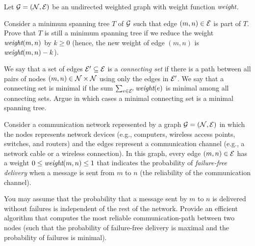 \begin{problem}
Let $\mathcal{G} = (\mathcal{N}, \mathcal{E})$ be an undirected weighted graph with weight function $\mathord{\textit{weight}}$. 
\begin{questions}
\item Consider a minimum spanning tree $T$ of $\mathcal{G}$ such that edge $(m, n) \in \mathcal{E}$ is part of $T$. Prove that $T$ is still a minimum spanning tree if we reduce the weight $\mathord{\textit{weight}}{(m, n)}$ by $k \geq 0$ (hence, the new weight of edge $(m, n)$ is $\mathord{\textit{weight}}{(m, n)} - k$).
\item We say that a set of edges $\mathcal{E}' \subseteq \mathcal{E}$ is a \emph{connecting set} if there is a path between all pairs of nodes $(m, n) \in \mathcal{N}\times\mathcal{N}$ using only the edges in $\mathcal{E}'$. We say that a connecting set is minimal if the sum $\sum_{e \in \mathcal{E}'} \mathord{\textit{weight}}(e)$ is minimal among all connecting sets. Argue in which cases a minimal connecting set is a minimal spanning tree.
\end{questions}
\end{problem}

\begin{problem}
Consider a communication network represented by a graph $\mathcal{G} = (\mathcal{N}, \mathcal{E})$ in which the nodes represents network devices (e.g., computers, wireless access points, switches, and routers) and the edges represent a communication channel (e.g., a network cable or a wireless connection). In this graph, every edge $(m, n) \in \mathcal{E}$ has a weight $0\leq\mathord{\textit{weight}}{(m, n)}\leq 1$ that indicates the probability of \emph{failure-free delivery} when a message is sent from $m$ to $n$ (the reliability of the communication channel).

You may assume that the probability that a message sent by $m$ to $n$ is delivered without failures is independent  of the rest of the network. Provide an efficient algorithm that computes the most reliable communication-path between two nodes (such that the probability of failure-free delivery is maximal and the probability of failures is minimal).
\end{problem}

\SUBMITMSG{}
\DEFAULTGRADING{}

